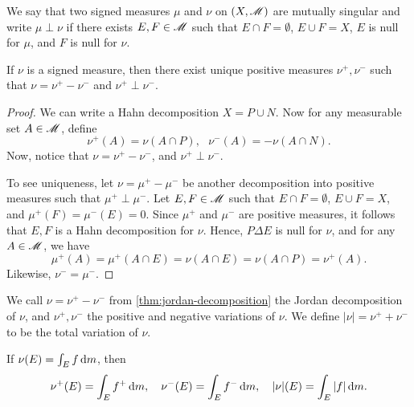 \documentclass[12pt]{article} %
\begin{document}
\begin{definition}
    We say that two signed measures $\mu$ and $\nu$ on $(X, \mathscr{M})$ are mutually singular and write $\mu \perp \nu$ if there exists $E, F \in \mathscr{M}$ such that $E \cap F = \emptyset$, $E \cup F = X$, $E$ is null for $\mu$, and $F$ is null for $\nu$. 
\end{definition}

\begin{theorem}\label{thm:jordan-decomposition}
    If $\nu$ is a signed measure, then there exist unique positive measures $\nu^+,\nu^-$ such that $\nu = \nu^+ - \nu^-$ and $\nu^+ \perp \nu^-$.
\end{theorem}

\begin{proof}
    We can write a Hahn decomposition $X = P \cup N$. Now for any measurable set $A \in \mathscr{M}$, define \[\nu^+(A) = \nu(A \cap P), \ \ \ \nu^-(A) = -\nu(A \cap N).\] Now, notice that $\nu = \nu^+ - \nu^-$, and $\nu^+ \perp \nu^-$. 

    To see uniqueness, let $\nu = \mu^+ - \mu^-$ be another decomposition into positive measures such that $\mu^+ \perp \mu^-$. Let $E, F \in \mathscr{M}$ such that $E \cap F = \emptyset$, $E \cup F = X$, and $\mu^+(F) = \mu^-(E) = 0$. Since $\mu^+$ and $\mu^-$ are positive measures, it follows that $E, F$ is a Hahn decomposition for $\nu$. Hence, $P \Delta E$ is null for $\nu$, and for any $A \in \mathscr{M}$, we have \[\mu^+(A) = \mu^+(A \cap E) = \nu(A \cap E) = \nu(A \cap P) = \nu^+(A).\] Likewise, $\nu^- = \mu^-$.
\end{proof}

\begin{definition}
    We call $\nu = \nu^+ - \nu^-$ from \cref{thm:jordan-decomposition} the Jordan decomposition of $\nu$, and $\nu^+, \nu^-$ the positive and negative variations of $\nu$. We define $|\nu| = \nu^+ + \nu^-$ to be the total variation of $\nu$. 
\end{definition}

\begin{example}
    If $\nu(E) = \int_E f \, \mathrm{d} m$, then \[\nu^+(E) = \int_E f^+ \, \mathrm{d} m, \ \ \ \nu^-(E) = \int_E f^- \, \mathrm{d} m, \ \ \ |\nu|(E) = \int_E |f| \, \mathrm{d} m.\]
\end{example}
\end{document}
